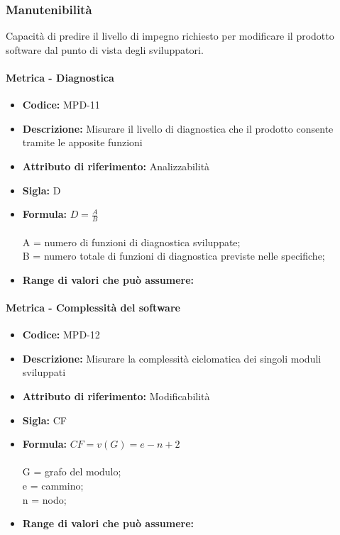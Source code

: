       
      
      
           
    \subsubsection{Manutenibilità} 
    Capacità di predire il livello di impegno richiesto per modificare il prodotto software dal punto di vista degli sviluppatori.
    
        \paragraph{Metrica - Diagnostica} 
           \begin{itemize}
          \item  \textbf{Codice:} MPD-11
          \item  \textbf{Descrizione:} Misurare il livello di diagnostica che il prodotto consente tramite le apposite funzioni 
          \item  \textbf{Attributo di riferimento:} Analizzabilità
         \item   \textbf{Sigla:} D
          \item  \textbf{Formula:} \begin{math}D = \frac{A}{B}\end{math}\\ \\
            A = numero di funzioni di diagnostica sviluppate;\\
            B = numero totale di funzioni di diagnostica previste nelle specifiche;
         \item  \textbf{Range di valori che può assumere:}
           \end{itemize}
           
           \paragraph{Metrica - Complessità del software} 
              \begin{itemize}
         \item   \textbf{Codice:} MPD-12
         \item   \textbf{Descrizione:} Misurare la complessità ciclomatica dei singoli moduli sviluppati
          \item  \textbf{Attributo di riferimento:} Modificabilità
          \item  \textbf{Sigla:} CF
         \item   \textbf{Formula:} \begin{math}CF = v(G) = e - n + 2 \end{math}\\ \\
            G = grafo del modulo;\\
            e = cammino;\\
            n = nodo; 
         \item  \textbf{Range di valori che può assumere:}
\end{itemize}

